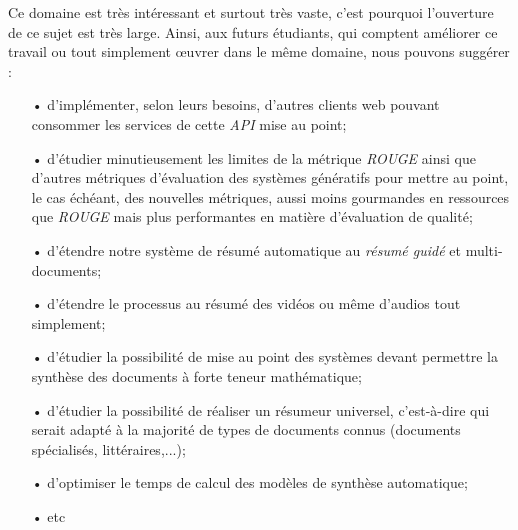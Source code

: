 Ce domaine est très intéressant et surtout très vaste, c'est pourquoi l'ouverture de ce sujet est très large. Ainsi, aux futurs étudiants, qui comptent améliorer ce travail ou tout simplement œuvrer dans le même domaine, nous pouvons suggérer :
\begin{itemize}
\item[•] d'implémenter, selon leurs besoins, d'autres clients web pouvant consommer les services de cette \textit{API} mise au point;
\item[•] d'étudier minutieusement les limites de la métrique \textit{ROUGE} ainsi que d'autres métriques d'évaluation des systèmes génératifs pour mettre au point, le cas échéant, des nouvelles métriques, aussi moins gourmandes en ressources que \textit{ROUGE} mais plus performantes en matière d'évaluation de qualité;
\item[•] d'étendre notre système de résumé automatique au \textit{résumé guidé} et multi-documents;
\item[•] d'étendre le processus au résumé des vidéos ou même d'audios tout simplement;
\item[•] d'étudier la possibilité de mise au point des systèmes devant permettre la synthèse des documents à forte teneur mathématique;
\item[•] d'étudier la possibilité de réaliser un résumeur universel, c'est-à-dire qui serait adapté à la majorité de types de documents connus (documents spécialisés, littéraires,...);
\item[•] d'optimiser le temps de calcul des modèles de synthèse automatique;
\item[•] etc
\end{itemize}